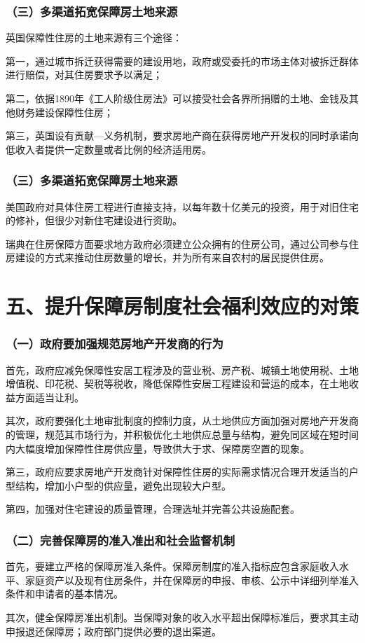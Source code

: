 \documentclass[aspectratio=169, 12pt]{beamer}
\begin{document}
\begin{frame}[plain]
    \frametitle{（三）多渠道拓宽保障房土地来源}
    英国保障性住房的土地来源有三个途径：
    \par
    第一，通过城市拆迁获得需要的建设用地，政府或受委托的市场主体对被拆迁群体进行赔偿，对其住房要求予以满足；
    \par
    第二，依据1890年《工人阶级住房法》可以接受社会各界所捐赠的土地、金钱及其他财务建设保障性住房；
    \par
    第三，英国设有贡献—义务机制，要求房地产商在获得房地产开发权的同时承诺向低收入者提供一定数量或者比例的经济适用房。
\end{frame}

\begin{frame}[plain]
    \frametitle{（三）多渠道拓宽保障房土地来源}
    美国政府对具体住房工程进行直接支持，以每年数十亿美元的投资，用于对旧住宅的修补，但很少对新住宅建设进行资助。
    \par
    瑞典在住房保障方面要求地方政府必须建立公众拥有的住房公司，通过公司参与住房建设的方式来推动住房数量的增长，并为所有来自农村的居民提供住房。
\end{frame}

\section{五、提升保障房制度社会福利效应的对策}

\begin{frame}[plain]
    \frametitle{（一）政府要加强规范房地产开发商的行为}
    首先，政府应减免保障性安居工程涉及的营业税、房产税、城镇土地使用税、土地增值税、印花税、契税等税收，降低保障性安居工程建设和营运的成本，在土地收益方面适当让利。
    \par
    其次，政府要强化土地审批制度的控制力度，从土地供应方面加强对房地产开发商的管理，规范其市场行为，并积极优化土地供应总量与结构，避免同区域在短时间内大幅度增加保障性住房供应量，导致供大于求、保障房空置的现象。
    \par
    第三，政府应要求房地产开发商针对保障性住房的实际需求情况合理开发适当的户型结构，增加小户型的供应量，避免出现较大户型。
    \par
    第四，加强对住宅建设的质量管理，合理选址并完善公共设施配套。
\end{frame}

\begin{frame}[plain]
    \frametitle{（二）完善保障房的准入准出和社会监督机制}
    首先，要建立严格的保障房准入条件。保障房制度的准入指标应包含家庭收入水平、家庭资产以及现有住房条件，并在保障房的申报、审核、公示中详细列举准入条件和申请者的基本情况。
    \par
    其次，健全保障房准出机制。当保障对象的收入水平超出保障标准后，要求其主动申报退还保障房；政府部门提供必要的退出渠道。
\end{frame}
\end{document}
